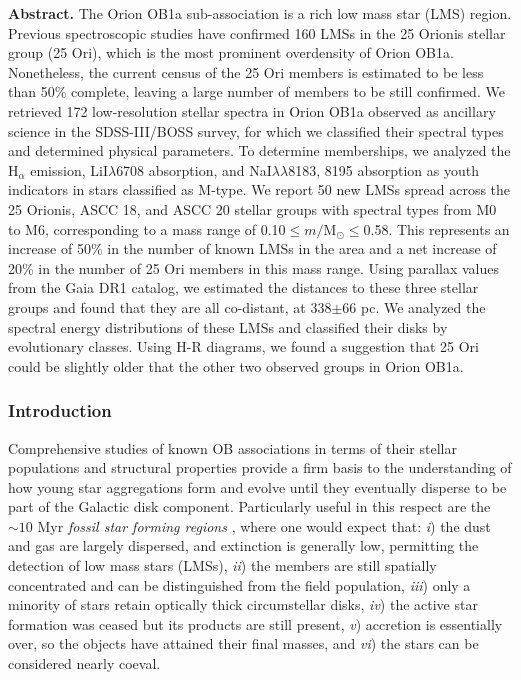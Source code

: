 \documentclass[12pt]{article}
\begin{document}

{\bf Abstract.}
The Orion OB1a sub-association is a rich low mass star (LMS) region. Previous spectroscopic studies have confirmed 160 LMSs in the 25 Orionis stellar group (25 Ori), which is the most prominent overdensity of Orion OB1a. Nonetheless, the current census of the 25 Ori members is estimated to be less than 50\% complete, leaving a large number of members to be still confirmed. We retrieved 172 low-resolution stellar spectra in Orion OB1a observed as ancillary science in the SDSS-III/BOSS survey, for which we classified their spectral types and determined physical parameters. To determine memberships, we analyzed the H$_\alpha$ emission, LiI$\lambda$6708 absorption, and NaI$\lambda\lambda$8183, 8195 absorption as youth indicators in stars classified as M-type. We report 50 new LMSs spread across the 25 Orionis, ASCC 18, and ASCC 20 stellar groups with spectral types from M0 to M6, corresponding to a mass range of 0.10$\le m/\textrm{M}_\odot \le$0.58. This represents an increase of 50\% in the number of known LMSs in the area and a net increase of 20\% in the number of 25 Ori members in this mass range. Using parallax values from the Gaia DR1 catalog, we estimated the distances to these three stellar groups and found that they are all co-distant, at 338$\pm$66 pc. We analyzed the spectral energy distributions of these LMSs and classified their disks by evolutionary classes. Using H-R diagrams, we found a suggestion that 25 Ori could be slightly older that the other two observed groups in Orion OB1a.

\subsubsection{Introduction}
\label{sec_BOSS:intro}
Comprehensive studies of known OB associations in terms of their stellar populations and structural properties provide a firm basis to the understanding of how young star aggregations form and evolve until they eventually disperse to be part of the Galactic disk component. Particularly useful in this respect are the $\sim 10$ Myr {\it fossil star forming regions} \citep[\ac{FSFR}s; ][]{Blaauw1991}, where one would expect that: \textit{i}) the dust and gas are largely dispersed, and extinction is generally low, permitting the detection of low mass stars (LMSs), \textit{ii}) the members are still spatially concentrated and can be distinguished from the field population, \textit{iii}) only a minority of stars retain optically thick circumstellar disks, \textit{iv}) the active star formation was ceased but its products are still present, \textit{v}) accretion is essentially over, so the objects have attained their final masses, and \textit{vi}) the stars can be considered nearly coeval.
\end{document}
